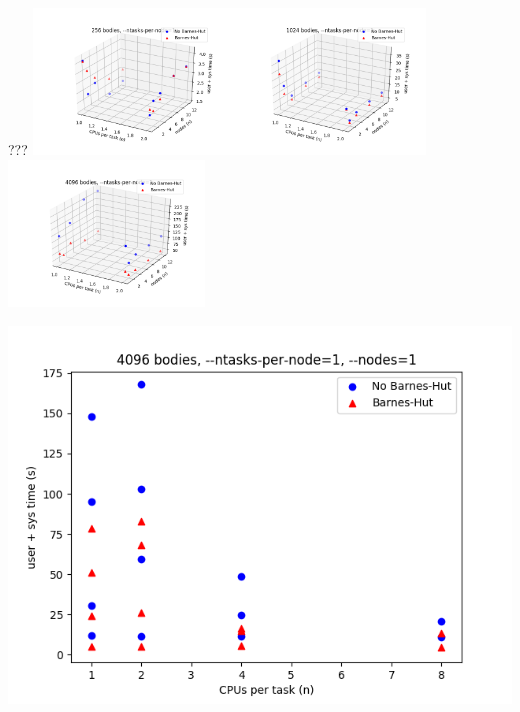 \documentclass{beamer}
\begin{document}
\begin{frame}[allowframebreaks]{???}
\includegraphics[width=5.2cm]{256-cpusPerTask-nodes-just_1_tpn}\includegraphics[width=5.2cm]{1024-cpusPerTask-nodes-just_1_tpn}\includegraphics[width=5.2cm]{4096-cpusPerTask-nodes-just_1_tpn}

\framebreak

\includegraphics[width=\linewidth]{scaling}

\end{frame}
\end{document}
